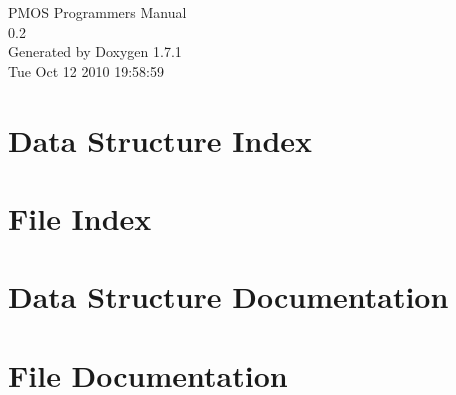 \documentclass[a4paper]{book}
\begin{document}
\hypersetup{pageanchor=false}
\begin{titlepage}
\vspace*{7cm}
\begin{center}
{\Large PMOS Programmers Manual \\[1ex]\large 0.2 }\\
\vspace*{1cm}
{\large Generated by Doxygen 1.7.1}\\
\vspace*{0.5cm}
{\small Tue Oct 12 2010 19:58:59}\\
\end{center}
\end{titlepage}
\clearemptydoublepage
{}
\tableofcontents
\clearemptydoublepage
{}
\hypersetup{pageanchor=true}
\chapter{Data Structure Index}

\chapter{File Index}

\chapter{Data Structure Documentation}






\chapter{File Documentation}














\printindex
\end{document}
